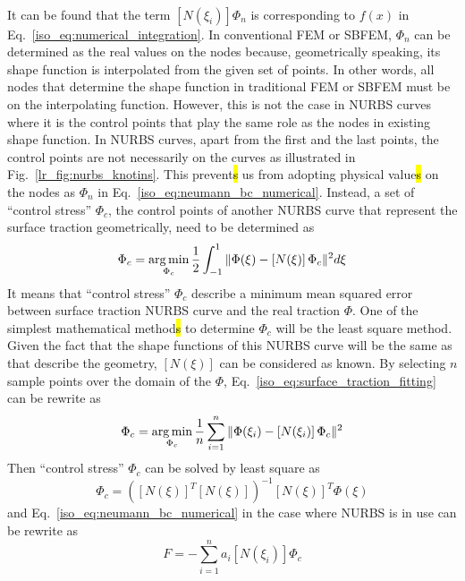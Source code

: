 \paragraph{}
It can be found that the term $[N(\xi_i)] \Phi_n$ is corresponding to $f(x)$ in Eq.~\ref{iso_eq:numerical_integration}.
In conventional FEM or SBFEM, $\Phi_n$ can be determined as the real values on the nodes because, geometrically speaking, its shape function is interpolated from the given set of points.
In other words, all nodes that determine the shape function in traditional FEM or SBFEM must be on the interpolating function.
However, this is not the case in NURBS curves where it is the control points that play the same role as the nodes in existing shape function.
In NURBS curves, apart from the first and the last points, the control points are not necessarily on the curves as illustrated in Fig.~\ref{lr_fig:nurbs_knotins}.
This prevent\hl{s} us from adopting physical value\hl{s} on the nodes as $\Phi_n$ in Eq.~\ref{iso_eq:neumann_bc_numerical}.
Instead, a set of ``control stress'' $\Phi_c$, the control points of another NURBS curve that represent the surface traction geometrically, need to be determined as 
    \begin{equation}
        \Phi_c = \operatorname*{arg\,min}_{\Phi_c}
            \frac{1}{2}
            \int_{-1}^1
            \|
                \Phi(\xi)-
                    \left[ N(\xi) \right]
                    \Phi_c
            \|^2
            d\xi            
    \label{iso_eq:surface_traction_fitting}
    \end{equation}
%
It means that ``control stress'' $\Phi_c$ describe a minimum mean squared error between surface traction NURBS curve and the real traction $\Phi$.
One of the simplest mathematical method\hl{s} to determine $\Phi_c$ will be the least square method.
Given the fact that the shape functions of this NURBS curve will be the same as that describe the geometry, $\left[ N(\xi) \right]$ can be considered as known.
By selecting $n$ sample points over the domain of the $\Phi$, Eq.~\ref{iso_eq:surface_traction_fitting} can be rewrite as
    \begin{equation}
        \Phi_c = \operatorname*{arg\,min}_{\Phi_c}
            \frac{1}{n}
            \sum_{i=1}^n
            \|
                \Phi(\xi_i)-
                    \left[ N(\xi_i) \right]
                    \Phi_c
            \|^2
    \label{iso_eq:surface_traction_fitting_discrete}
    \end{equation}
Then ``control stress'' $\Phi_c$ can be solved by least square as
    \begin{equation}
        \Phi_c= \left(
            \left[ N(\xi) \right] ^T
            \left[ N(\xi) \right]
        \right)^{-1}
        \left[ N(\xi) \right]^T
        \Phi(\xi)
    \end{equation}
and Eq.~\ref{iso_eq:neumann_bc_numerical} in the case where NURBS is in use can be rewrite as
    \begin{equation}
        {F}=-\sum_{i=1}^n
        a_i
        [N(\xi_i)]
        \Phi_c
    \label{iso_eq:neumann_bc_numerical_NURBS}
    \end{equation}
